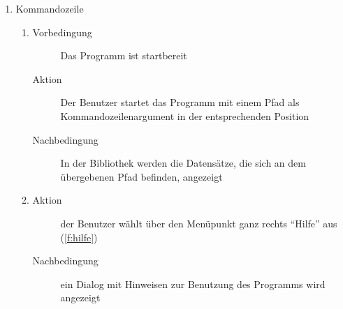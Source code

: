 \begin{enumerate} [label=\bfseries /TS \arabic*0/, leftmargin=*]
\begin{enumerate}[leftmargin=0pt, itemindent=0pt]
\begin{description}
		\end{description}
		\item
		\begin{description}
			\item[Aktion] Der Benutzer startet die Suche erneut
			\item[Nachbedingung] Eine Animation zeigt die Aktivität des Suchverfahrens an (\ref{f:fortschrittsanimation})
		\end{description}
		\item
		\begin{description}
			\item[Aktion] Der Benutzer beendet das Programm (während der laufenden Suche) über den üblichen Schließen-Button (\ref{f:beenden})
			\item[Nachbedingung] die GUI ist nicht mehr sichtbar; der Prozess hat terminiert
		\end{description}
	\end{enumerate}

	\item Kommandozeile \label{ts:standardordner_übergeben}
	\begin{enumerate}[leftmargin=0pt]
		\item
		\begin{description}
			\item[Vorbedingung] Das Programm ist startbereit
			\item[Aktion] Der Benutzer startet das Programm mit einem Pfad als Kommandozeilenargument in der entsprechenden Position
			\item[Nachbedingung] In der Bibliothek werden die Datensätze, die sich an dem übergebenen Pfad befinden, angezeigt
		\end{description}
		\item
		\begin{description}
			\item[Aktion] der Benutzer wählt über den Menüpunkt ganz rechts \enquote{Hilfe} aus (\ref{f:hilfe})
			\item[Nachbedingung] ein \gls{Dialog} mit Hinweisen zur Benutzung des Programms wird angezeigt
		\end{description}
	\end{enumerate}


\end{enumerate}
